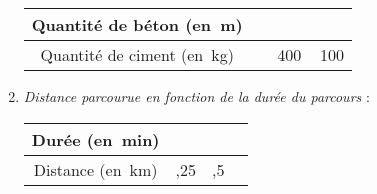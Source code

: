 \begin{exercice}
\begin{enumerate}
\begin{center}
\begin{tabularx}{\linewidth}{|c|*{3}{>{\centering\arraybackslash}X|}}
  \hline
 \rowcolor{H3} Quantité de béton (en m\up{3}) & 1 & 4 & 6 \\\hline
 \rowcolor{J3} Quantité de ciment (en kg) & 350 & 1\,400 & 2\,100 \\\hline
 \end{tabularx}
\end{center}
 \vspace{0.3cm}
 \item \emph{Distance parcourue en fonction de la durée du parcours} :
 \vspace{0.3cm}
 \begin{center}
  \begin{tabularx}{\linewidth}{|c|*{3}{>{\centering\arraybackslash}X|}}
  \hline
 \rowcolor{H3} Durée (en min) & 7 & 6 & 4 \\\hline
 \rowcolor{J3} Distance (en km) & 12,25 & 10,5 & 7 \\\hline
 \end{tabularx}
\end{center}
 \end{enumerate}
\end{exercice}


